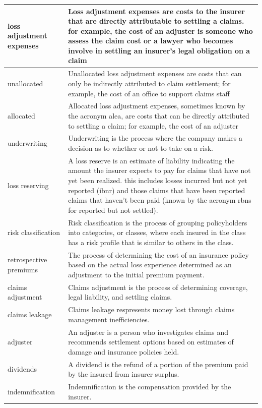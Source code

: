 \documentclass[
]{book}
\begin{document}
\begin{longtable}{>{\raggedright\arraybackslash}p{10em}|>{\raggedright\arraybackslash}p{30em}}
\hline
loss adjustment expenses & Loss adjustment expenses are costs to the insurer that are directly attributable to settling a claims. for example, the cost of an adjuster is someone who assess the claim cost or a lawyer who becomes involve in settling an insurer's legal obligation on a claim\\
\hline
unallocated & Unallocated loss adjustment expenses are costs that can only be indirectly attributed to claim settlement; for example, the cost of an office to support claims staff\\
\hline
allocated & Allocated loss adjustment expenses, sometimes known by the acronym alea, are costs that can be directly attributed to settling a claim; for example, the cost of an adjuster\\
\hline
underwriting & Underwriting is the process where the company makes a decision as to whether or not to take on a risk.\\
\hline
loss reserving & A loss reserve is an estimate of liability indicating the amount the insurer expects to pay for claims that have not yet been realized. this includes losses incurred but not yet reported (ibnr) and those claims that have been reported claims that haven't been paid (known by the acronym rbns for reported but not settled).\\
\hline
risk classification & Risk classification is the process of grouping policyholders into categories, or classes, where each insured in the class has a risk profile that is similar to others in the class.\\
\hline
retrospective premiums & The process of determining the cost of an insurance policy based on the actual loss experience determined as an adjustment to the initial premium payment.\\
\hline
claims adjustment & Claims adjustment is the process of determining coverage, legal liability, and settling claims.\\
\hline
claims leakage & Claims leakage respresents money lost through claims management inefficiencies.\\
\hline
adjuster & An adjuster is a person who investigates claims and recommends settlement options based on estimates of damage and insurance policies held.\\
\hline
dividends & A dividend is the refund of a portion of the premium paid by the insured from insurer surplus.\\
\hline
indemnification & Indemnification is the compensation provided by the insurer.\\

\end{longtable}
\end{document}
